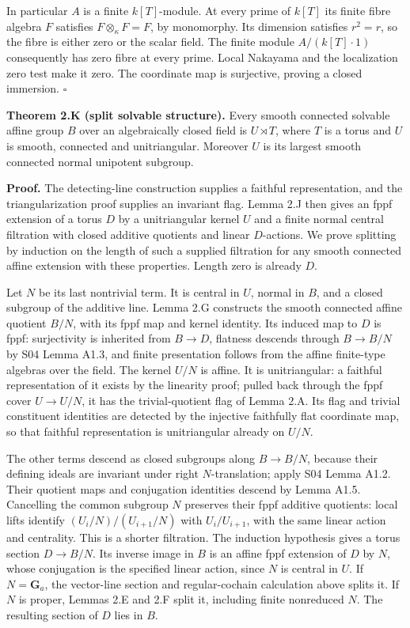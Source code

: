 \documentclass[11pt,a4paper,openany]{report}
\begin{document}
In particular \(A\) is a finite \(k[T]\)-module. At every prime of \(k[T]\) its finite fibre algebra \(F\) satisfies \(F\otimes_\kappa F=F\), by monomorphy. Its dimension satisfies \(r^2=r\), so the fibre is either zero or the scalar field. The finite module \(A/(k[T]\cdot1)\) consequently has zero fibre at every prime. Local Nakayama and the localization zero test make it zero. The coordinate map is surjective, proving a closed immersion. \(\square\)

\textbf{Theorem 2.K (split solvable structure).} Every smooth connected solvable affine group \(B\) over an algebraically closed field is \(U\rtimes T\), where \(T\) is a torus and \(U\) is smooth, connected and unitriangular. Moreover \(U\) is its largest smooth connected normal unipotent subgroup.

\textbf{Proof.} The detecting-line construction supplies a faithful representation, and the triangularization proof supplies an invariant flag. Lemma 2.J then gives an fppf extension of a torus \(D\) by a unitriangular kernel \(U\) and a finite normal central filtration with closed additive quotients and linear \(D\)-actions. We prove splitting by induction on the length of such a supplied filtration for any smooth connected affine extension with these properties. Length zero is already \(D\).

Let \(N\) be its last nontrivial term. It is central in \(U\), normal in \(B\), and a closed subgroup of the additive line. Lemma 2.G constructs the smooth connected affine quotient \(B/N\), with its fppf map and kernel identity. Its induced map to \(D\) is fppf: surjectivity is inherited from \(B\to D\), flatness descends through \(B\to B/N\) by S04 Lemma A1.3, and finite presentation follows from the affine finite-type algebras over the field. The kernel \(U/N\) is affine. It is unitriangular: a faithful representation of it exists by the linearity proof; pulled back through the fppf cover \(U\to U/N\), it has the trivial-quotient flag of Lemma 2.A. Its flag and trivial constituent identities are detected by the injective faithfully flat coordinate map, so that faithful representation is unitriangular already on \(U/N\).

The other terms descend as closed subgroups along \(B\to B/N\), because their defining ideals are invariant under right \(N\)-translation; apply S04 Lemma A1.2. Their quotient maps and conjugation identities descend by Lemma A1.5. Cancelling the common subgroup \(N\) preserves their fppf additive quotients: local lifts identify \((U_i/N)/(U_{i+1}/N)\) with \(U_i/U_{i+1}\), with the same linear action and centrality. This is a shorter filtration. The induction hypothesis gives a torus section \(D\to B/N\). Its inverse image in \(B\) is an affine fppf extension of \(D\) by \(N\), whose conjugation is the specified linear action, since \(N\) is central in \(U\). If \(N=\mathbf G_a\), the vector-line section and regular-cochain calculation above splits it. If \(N\) is proper, Lemmas 2.E and 2.F split it, including finite nonreduced \(N\). The resulting section of \(D\) lies in \(B\).
\end{document}
